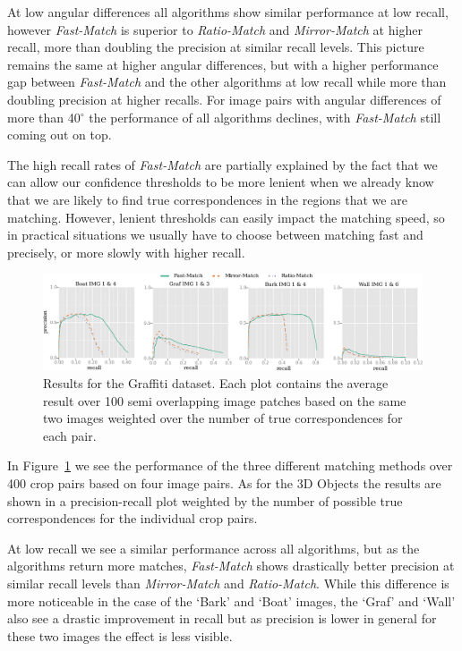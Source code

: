 \documentclass[10pt,twocolumn,letterpaper]{article}
\begin{document}
At low angular differences all algorithms show similar performance at low recall, however \emph{Fast-Match} is superior to \emph{Ratio-Match} and \emph{Mirror-Match} at higher recall, more than doubling the precision at similar recall levels. This picture remains the same at higher angular differences, but with a higher performance gap between \emph{Fast-Match} and the other algorithms at low recall while more than doubling precision at higher recalls. For image pairs with angular differences of more than 40$^{\circ}$ the performance of all algorithms declines, with \emph{Fast-Match} still coming out on top. 

The high recall rates of \emph{Fast-Match} are partially explained by the fact that we can allow our confidence thresholds to be more lenient when we already know that we are likely to find true correspondences in the regions that we are matching. However, lenient thresholds can easily impact the matching speed, so in practical situations we usually have to choose between matching fast and precisely, or more slowly with higher recall. 

\begin{figure}[t]
\centering
\includegraphics[width=1\columnwidth]{images/patches_all_horz}
\caption{Results for the Graffiti dataset. Each plot contains the
average result over 100 semi overlapping image patches based on the same
two images weighted over the number of true correspondences for each pair.}
\label{fig:patches}
\end{figure}

In Figure~\ref{fig:patches} we see the performance of the three different matching methods over 400 crop pairs based on four image pairs. As for the 3D Objects the results are shown in a precision-recall plot weighted by the number of possible true correspondences for the individual crop pairs.

At low recall we see a similar performance across all algorithms, but as the algorithms return more matches, \emph{Fast-Match} shows drastically better precision at similar recall levels than \emph{Mirror-Match} and \emph{Ratio-Match}. While this difference is more noticeable in the case of the `Bark' and `Boat' images, the `Graf' and `Wall' also see a drastic improvement in recall but as precision is lower in general for these two images the effect is less visible.
\end{document}
